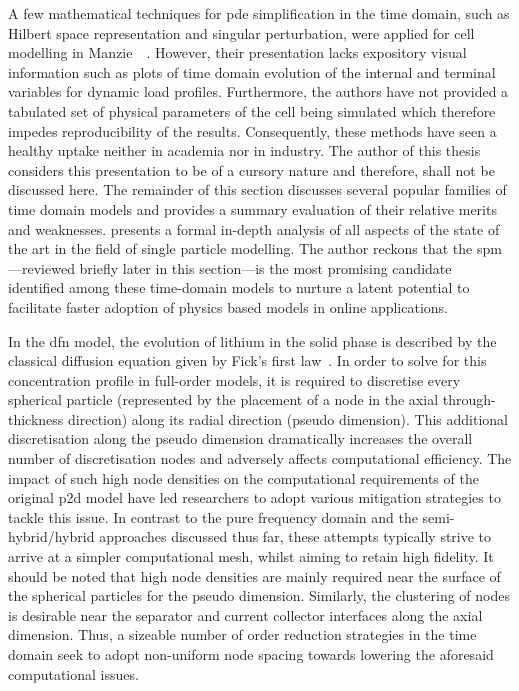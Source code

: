 A few mathematical  techniques for \gls{pde} simplification in  the time domain,
such as Hilbert space representation and singular perturbation, were applied for
cell  modelling in  Manzie~\etal~\cite{Manzie2015}. However,  their presentation
lacks expository  visual information such as  plots of time domain  evolution of
the internal and terminal variables  for dynamic load profiles. Furthermore, the
authors  have  not provided  a  tabulated  set  of  physical parameters  of  the
cell being  simulated which  therefore impedes  reproducibility of  the results.
Consequently, these methods  have seen a healthy uptake neither  in academia nor
in industry. The  author of this thesis  considers this presentation to  be of a
cursory  nature  and therefore,  shall  not  be  discussed here.  The  remainder
of  this  section discusses  several  popular  families  of time  domain  models
and  provides a  summary evaluation  of  their relative  merits and  weaknesses.
 presents a formal in-depth  analysis of all aspects of the
state of the art  in the field of single particle  modelling. The author reckons
that  the  \gls{spm}---reviewed briefly  later  in  this section---is  the  most
promising  candidate identified  among  these time-domain  models  to nurture  a
latent potential to facilitate faster adoption of physics based models in online
applications.



In the \gls{dfn} model, the evolution of lithium in the solid phase is described
by the classical  diffusion equation given by  Fick's first law~\cite{Fick1995}.
In order  to solve for  this concentration profile  in full-order models,  it is
required to discretise every spherical particle (represented by the placement of
a  node  in  the  axial  \ie{} through-thickness  direction)  along  its  radial
direction (pseudo  dimension). This  additional discretisation along  the pseudo
dimension dramatically increases the overall  number of discretisation nodes and
adversely  affects  computational  efficiency.  The impact  of  such  high  node
densities on the computational requirements of the original \gls{p2d} model have
led researchers to adopt various mitigation  strategies to tackle this issue. In
contrast  to the  pure frequency  domain and  the semi-hybrid/hybrid  approaches
discussed  thus far,  these attempts  typically strive  to arrive  at a  simpler
computational mesh,  whilst aiming to retain  high fidelity. It should  be noted
that high node  densities are mainly required near the  surface of the spherical
particles  for the  pseudo  dimension.  Similarly, the  clustering  of nodes  is
desirable near  the separator and  current collector interfaces along  the axial
dimension.  Thus, a
sizeable  number of  order  reduction  strategies in  the  time  domain seek  to
adopt  non-uniform node  spacing  towards lowering  the aforesaid  computational
issues.

